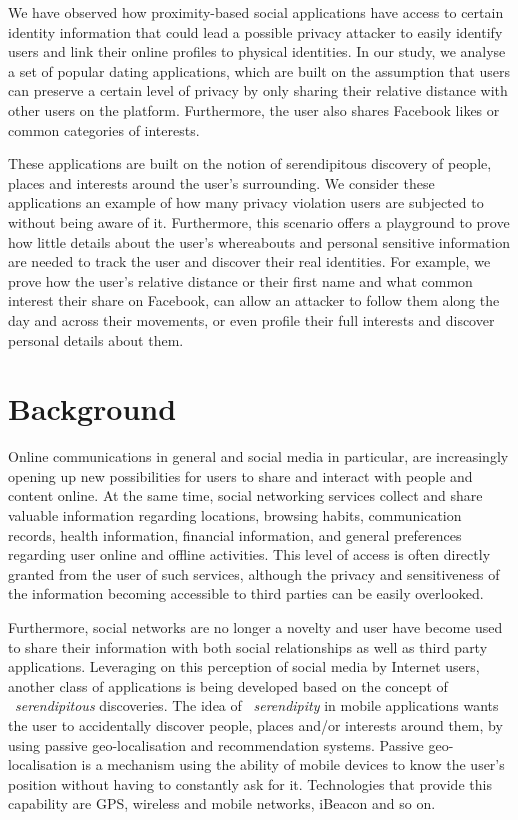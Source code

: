 We have observed how proximity-based social applications have access to certain identity information that could lead a possible privacy attacker to easily identify users and link their online profiles to physical identities. In our study, we analyse a set of popular dating applications, which are built on the assumption that users can preserve a certain level of privacy by only sharing their relative distance with other users on the platform. Furthermore, the user also shares Facebook likes or common categories of interests.

These applications are built on the notion of serendipitous discovery of people, places and interests around the user's surrounding.  We consider these applications an example of how many privacy violation users are subjected to without being aware of it. Furthermore, this scenario offers a playground to prove how little details about the user's whereabouts and personal sensitive information are needed to track the user and discover their real identities.  For example, we prove how the user's relative distance or their first name and what common interest their share on Facebook, can allow an attacker to follow them along the day and across their movements, or even profile their full interests and discover personal details about them.

\section{Background}
\noindent
Online communications in general and social media in particular, are increasingly opening up new possibilities for users to share and interact with people and content online. At the same time, social networking services collect and share valuable information regarding locations, browsing habits, communication records, health information, financial information, and general preferences regarding user online and offline activities. This level of access is often directly granted from the user of such services, although the privacy and sensitiveness of the information becoming accessible to third parties can be easily overlooked.

Furthermore, social networks are no longer a novelty and user have become used to share their information with both social relationships as well as third party applications. Leveraging on this perception of social media by Internet users, another class of applications is being developed based on the concept of ~\emph{serendipitous} discoveries. The idea of ~\emph{serendipity} in mobile applications wants the user to accidentally discover people, places and/or interests around them, by using passive geo-localisation and recommendation systems. Passive geo-localisation is a mechanism using the ability of mobile devices to know the user's position without having to constantly ask for it. Technologies that provide this capability are GPS, wireless and mobile networks, iBeacon and so on.

